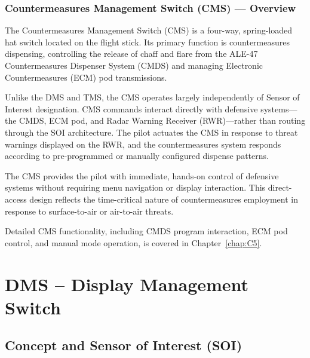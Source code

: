 \documentclass[11pt, a4paper, twoside]{report}
\begin{document}
\subsection{Countermeasures Management Switch (CMS) — Overview}
\label{sec:C2-S3-S3}

The Countermeasures Management Switch (CMS) is a four-way, spring-loaded hat switch located on the flight stick. Its primary function is countermeasures dispensing, controlling the release of chaff and flare from the ALE-47 Countermeasures Dispenser System (CMDS) and managing Electronic Countermeasures (ECM) pod transmissions.

Unlike the DMS and TMS, the CMS operates largely independently of Sensor of Interest designation. CMS commands interact directly with defensive systems—the CMDS, ECM pod, and Radar Warning Receiver (RWR)—rather than routing through the SOI architecture. The pilot actuates the CMS in response to threat warnings displayed on the RWR, and the countermeasures system responds according to pre-programmed or manually configured dispense patterns.

The CMS provides the pilot with immediate, hands-on control of defensive systems without requiring menu navigation or display interaction. This direct-access design reflects the time-critical nature of countermeasures employment in response to surface-to-air or air-to-air threats.

Detailed CMS functionality, including CMDS program interaction, ECM pod control, and manual mode operation, is covered in Chapter~\ref{chap:C5}.
\newpage

\chapter{DMS -- Display Management Switch}
\label{chap:C3}

\section{Concept and Sensor of Interest (SOI)}
\label{sec:C3-S1}
\end{document}
